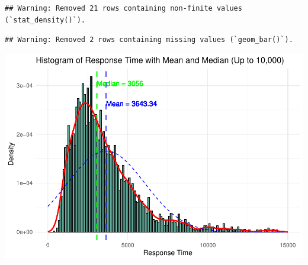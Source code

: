 \documentclass[
]{article}
\begin{document}
\begin{verbatim}
## Warning: Removed 21 rows containing non-finite values (`stat_density()`).
\end{verbatim}

\begin{verbatim}
## Warning: Removed 2 rows containing missing values (`geom_bar()`).
\end{verbatim}

\includegraphics{EDA_DavidMC_files/figure-latex/knitr::opts_chunk$set(warning=FALSE,message=FALSE)-1.pdf}
\end{document}
